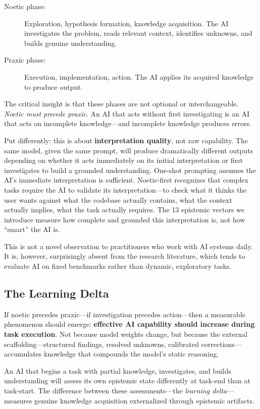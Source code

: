 \begin{description}
    \item[Noetic phase:] Exploration, hypothesis formation, knowledge acquisition. The AI investigates the problem, reads relevant context, identifies unknowns, and builds genuine understanding.
    \item[Praxic phase:] Execution, implementation, action. The AI applies its acquired knowledge to produce output.
\end{description}

The critical insight is that these phases are not optional or interchangeable. \emph{Noetic must precede praxic}. An AI that acts without first investigating is an AI that acts on incomplete knowledge---and incomplete knowledge produces errors.

Put differently: this is about \textbf{interpretation quality}, not raw capability. The same model, given the same prompt, will produce dramatically different outputs depending on whether it acts immediately on its initial interpretation or first investigates to build a grounded understanding. One-shot prompting assumes the AI's immediate interpretation is sufficient. Noetic-first recognizes that complex tasks require the AI to validate its interpretation---to check what it thinks the user wants against what the codebase actually contains, what the context actually implies, what the task actually requires. The 13 epistemic vectors we introduce measure how complete and grounded this interpretation is, not how ``smart'' the AI is.

This is not a novel observation to practitioners who work with AI systems daily. It is, however, surprisingly absent from the research literature, which tends to evaluate AI on fixed benchmarks rather than dynamic, exploratory tasks.

\subsection{The Learning Delta}

If noetic precedes praxic---if investigation precedes action---then a measurable phenomenon should emerge: \textbf{effective AI capability should increase during task execution}. Not because model weights change, but because the external scaffolding---structured findings, resolved unknowns, calibrated corrections---accumulates knowledge that compounds the model's static reasoning.

An AI that begins a task with partial knowledge, investigates, and builds understanding will assess its own epistemic state differently at task-end than at task-start. The difference between these assessments---the \emph{learning delta}---measures genuine knowledge acquisition externalized through epistemic artifacts.

